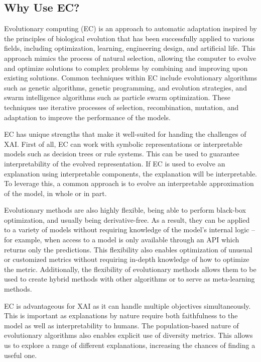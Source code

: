\documentclass[graybox]{svmult}
\begin{document}
\subsection{Why Use EC?}

Evolutionary computing (EC) is an approach to automatic adaptation inspired 
by the principles of biological evolution that has been successfully applied to various fields, 
including optimization, learning, engineering design, and artificial life. 
This approach mimics the process of natural selection, 
allowing the computer to evolve and optimize solutions to complex problems 
by combining and improving upon existing solutions.
Common techniques within EC include evolutionary algorithms such as genetic algorithms, genetic programming, and evolution strategies, 
and swarm intelligence algorithms such as particle swarm optimization. 
These techniques use iterative processes of selection, recombination, mutation, 
and adaptation to improve the performance of the models.

EC has unique strengths 
that make it well-suited for handing the challenges of XAI. 
First of all, EC can work with symbolic representations 
or interpretable models such as decision trees or rule systems. 
This can be used to guarantee interpretability of the evolved representation. 
If EC is used to evolve an explanation using interpretable components, 
the explanation will be interpretable. 
To leverage this, a common approach is to evolve an interpretable approximation of the model, 
in whole or in part.

Evolutionary methods are also highly flexible, 
being able to perform black-box optimization, 
and usually being derivative-free. 
As a result, they can be applied to a variety of models without requiring knowledge of the model's internal logic -- 
for example, when access to a model is only available through an API which returns only the predictions. 
This flexibility also enables optimization of unusual or customized metrics without requiring in-depth knowledge of how to optimize the metric. 
Additionally, the flexibility of evolutionary methods allows them
to be used to create hybrid methods with other algorithms 
or to serve as meta-learning methods.

EC is advantageous for XAI as it can handle multiple objectives simultaneously. 
This is important as explanations by nature require both faithfulness to the model 
as well as interpretability to humans. 
The population-based nature of evolutionary algorithms also enables explicit use of diversity metrics. 
This allows us to explore a range of different explanations, increasing the chances of finding a useful one.
\end{document}
